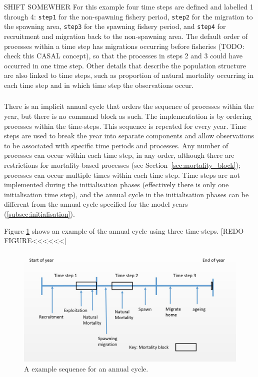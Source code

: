 SHIFT SOMEWHER For this example four time steps are defined and labelled 1 through 4: \texttt{step1} for the non-spawning fishery period, \texttt{step2} for the migration to the spawning area, \texttt{step3} for the spawning fishery period, and \texttt{step4} for recruitment and migration back to the non-spawning area. The default order of processes within a time step has migrations occurring before fisheries (TODO: check this CASAL concept), so that the processes in steps 2 and 3 could have occurred in one time step. Other details that describe the population structure are also linked to time steps, such as proportion of natural mortality occurring in each time step and in which time step the observations occur.


\subsubsection{}

There is an implicit annual cycle that orders the sequence of processes within the year, but there is no command block as such. The implementation is by ordering processes within the time-steps. This sequence is repeated for every year. Time steps are used to break the year into separate components and allow observations to be associated with specific time periods and processes. Any number of processes can occur within each time step, in any order, although there are restrictions for mortality-based processes (see Section~\ref{sec:mortality_block}); processes can occur multiple times within each time step. Time steps are not implemented during the initialisation phases (effectively there is only one initialisation time step), and the annual cycle in the initialisation phases can be different from the annual cycle specified for the model years (\ref{subsec:initialisation}). 

Figure \ref{Fig:annual} shows an example of the annual cycle using three time-steps.
[REDO FIGURE<<<<<<]
\begin{figure}[H]
	\centering
	\includegraphics[scale=0.5]{Figures/annual_cycle.jpg}
	\caption{A example sequence for an annual cycle.}\label{Fig:annual}
\end{figure}

